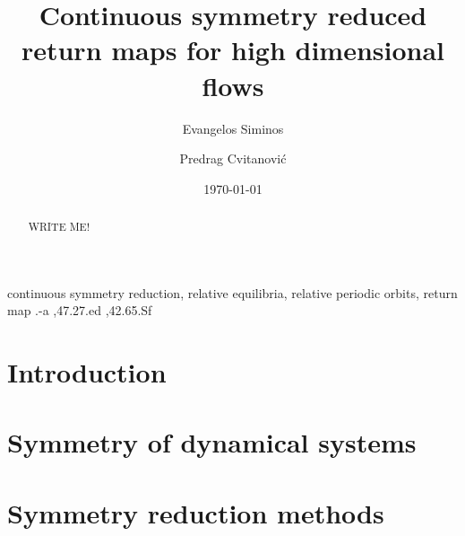 \documentclass[preprint,number]{elsarticle}
\begin{document}
\begin{frontmatter}


			\title{
Continuous symmetry reduced return maps for high dimensional flows 
			}
\author[gatech]{Evangelos Siminos}
\author[gatech]{Predrag Cvitanovi\'c}
\address[gatech]{Center for Nonlinear Science,
School of Physics, Georgia Institute of Technology,
Atlanta, GA 30332-0430}


\date{\today}

\begin{abstract}
WRITE ME!
\end{abstract}

\begin{keyword}
continuous symmetry reduction, relative equilibria, relative periodic orbits, return map
.-a \sep 47.27.ed \sep 42.65.Sf
\end{keyword}

\end{frontmatter}

\section{\label{s:intro} Introduction}
    

\subsection{\label{s:introCLE} \CLe}
    

\section{\label{s:symDyn} Symmetry of dynamical systems}
    

\section{\label{s:symRedGeneral} Symmetry reduction methods}
    
    
    
    
    
\end{document}
